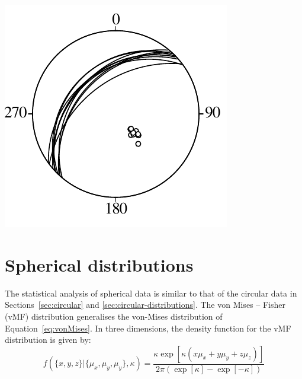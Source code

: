 \begin{enumerate}
\noindent\begin{minipage}[t][][b]{.3\linewidth}
\includegraphics[width=\textwidth]{../figures/fault.pdf}\medskip
\end{minipage}
\begin{minipage}[t][][t]{.7\linewidth}
  \label{fig:fault}
\end{minipage}

\end{enumerate}

\section{Spherical distributions}
\label{sec:spherical-distributions}

The statistical analysis of spherical data is similar to that of the
circular data in Sections~\ref{sec:circular} and
\ref{sec:circular-distributions}. The von Mises -- Fisher (vMF)
distribution generalises the von-Mises distribution of
Equation~\ref{eq:vonMises}.  In three dimensions, the density function
for the vMF distribution is given by:
\begin{equation}
  f(\{x,y,z\}|\{\mu_x,\mu_y,\mu_y\},\kappa) = \frac{\kappa\exp[\kappa
      (x\mu_x+y\mu_y+z\mu_z)]}{2\pi(\exp[\kappa]-\exp[-\kappa])}
  \label{eq:vonMisesFisher}
\end{equation}

